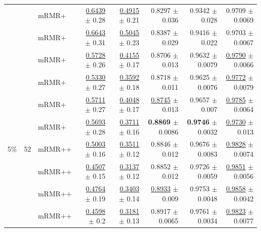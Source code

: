 \begin{longtable}{llp{}rrrrr}
 &  & mRMR+ & \underline{0.6439} {\scriptsize $\pm$ 0.28} & \underline{0.4915} {\scriptsize $\pm$ 0.21} & 0.8297 {\scriptsize $\pm$ 0.036} & 0.9342 {\scriptsize $\pm$ 0.028} & 0.9709 {\scriptsize $\pm$ 0.0069} \\
 &  & mRMR+ & \underline{0.6643} {\scriptsize $\pm$ 0.31} & \underline{0.5045} {\scriptsize $\pm$ 0.23} & 0.8387 {\scriptsize $\pm$ 0.029} & 0.9416 {\scriptsize $\pm$ 0.022} & 0.9703 {\scriptsize $\pm$ 0.0067} \\
 &  & mRMR+ & \underline{0.5728} {\scriptsize $\pm$ 0.26} & \underline{0.4155} {\scriptsize $\pm$ 0.17} & 0.8706 {\scriptsize $\pm$ 0.013} & 0.9632 {\scriptsize $\pm$ 0.0079} & \underline{0.9790} {\scriptsize $\pm$ 0.0066} \\
 &  & mRMR+ & \underline{0.5330} {\scriptsize $\pm$ 0.27} & \underline{0.3592} {\scriptsize $\pm$ 0.18} & 0.8718 {\scriptsize $\pm$ 0.011} & 0.9625 {\scriptsize $\pm$ 0.0076} & \underline{0.9772} {\scriptsize $\pm$ 0.0079} \\
 &  & mRMR+ & \underline{0.5711} {\scriptsize $\pm$ 0.27} & \underline{0.4048} {\scriptsize $\pm$ 0.17} & \underline{0.8745} {\scriptsize $\pm$ 0.013} & 0.9657 {\scriptsize $\pm$ 0.007} & \underline{0.9785} {\scriptsize $\pm$ 0.0064} \\
 &  & mRMR+ & \underline{0.5693} {\scriptsize $\pm$ 0.28} & \underline{0.3711} {\scriptsize $\pm$ 0.16} & \textbf{0.8869} {\scriptsize $\pm$ 0.0086} & \textbf{0.9746} {\scriptsize $\pm$ 0.0032} & \underline{0.9730} {\scriptsize $\pm$ 0.013} \\
\midrule
5\% & 52 & mRMR++ & \underline{0.5003} {\scriptsize $\pm$ 0.16} & \underline{0.3511} {\scriptsize $\pm$ 0.12} & 0.8846 {\scriptsize $\pm$ 0.012} & 0.9676 {\scriptsize $\pm$ 0.0083} & \underline{0.9828} {\scriptsize $\pm$ 0.0074} \\
 &  & mRMR++ & \underline{0.4507} {\scriptsize $\pm$ 0.15} & \underline{0.3137} {\scriptsize $\pm$ 0.12} & 0.8852 {\scriptsize $\pm$ 0.012} & 0.9726 {\scriptsize $\pm$ 0.0059} & \underline{0.9851} {\scriptsize $\pm$ 0.0056} \\
 &  & mRMR++ & \underline{0.4764} {\scriptsize $\pm$ 0.19} & \underline{0.3403} {\scriptsize $\pm$ 0.14} & \underline{0.8933} {\scriptsize $\pm$ 0.009} & 0.9753 {\scriptsize $\pm$ 0.0048} & \underline{0.9858} {\scriptsize $\pm$ 0.0042} \\
 &  & mRMR++ & \underline{0.4598} {\scriptsize $\pm$ 0.2} & \underline{0.3181} {\scriptsize $\pm$ 0.13} & 0.8917 {\scriptsize $\pm$ 0.0065} & 0.9761 {\scriptsize $\pm$ 0.0034} & \underline{0.9823} {\scriptsize $\pm$ 0.0077} \\

\end{longtable}
